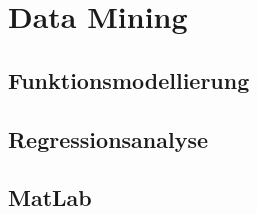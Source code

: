 \section{Data Mining}
\subsection{Funktionsmodellierung}
\subsection{Regressionsanalyse}
\subsection{MatLab}